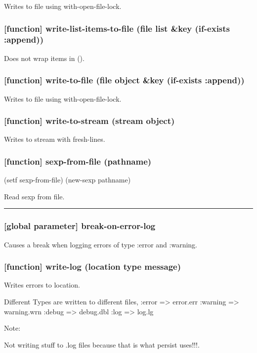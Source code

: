 \documentclass[11pt]{article}
\begin{document}
Writes to file using with-open-file-lock.

\subsubsection{[function] write-list-items-to-file (file list \&key (if-exists :append))}
\label{sec:orgd1b028d}

Does not wrap items in ().

\subsubsection{[function] write-to-file (file object \&key (if-exists :append))}
\label{sec:org8af8b68}

Writes to file using with-open-file-lock.

\subsubsection{[function] write-to-stream (stream object)}
\label{sec:orgc499f9c}

Writes to stream with fresh-lines.

\subsubsection{[function] sexp-from-file (pathname)}
\label{sec:org68e2a68}
(setf sexp-from-file) (new-sexp pathname)

Read sexp from file.

\noindent\rule{\textwidth}{0.5pt}
\subsubsection{[global parameter] \textbf{break-on-error-log}}
\label{sec:orge26bd00}

Causes a break when logging errors of type :error and :warning.

\subsubsection{[function] write-log (location type message)}
\label{sec:org4a08d4f}

Writes errors to location.

Different Types are written to different files,
:error => error.err
:warning => warning.wrn
:debug => debug.dbl
:log => log.lg

Note:

Not writing stuff to .log files because that is what persist uses!!!.
\end{document}
